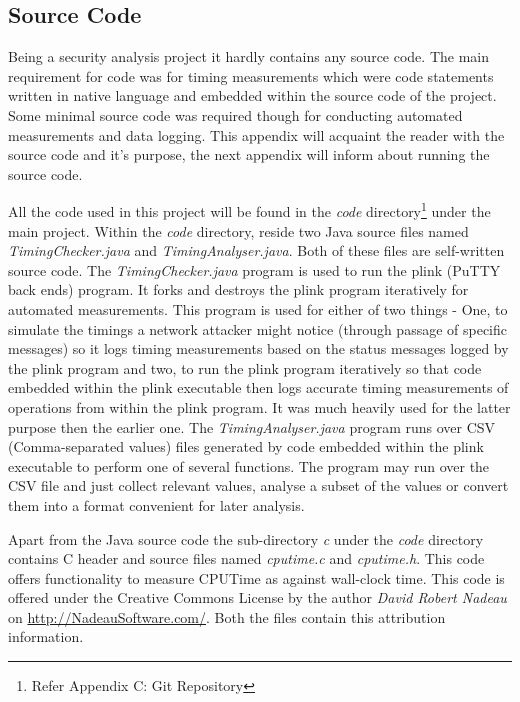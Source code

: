 \documentclass{bhamthesis}
\begin{document}
\begin{appendices}
\chapter{Source Code}
Being a security analysis project it hardly contains any source code. The main requirement for code was for timing measurements which were code statements written in native language and embedded within the source code of the project. Some minimal source code was required though for conducting automated measurements and data logging. This appendix will acquaint the reader with the source code and it's purpose, the next appendix will inform about running the source code.\par
All the code used in this project will be found in the \textit{code} directory\footnote{Refer Appendix C: Git Repository} under the main project. Within the \textit{code} directory, reside two Java source files named \textit{TimingChecker.java} and \textit{TimingAnalyser.java}. Both of these files are self-written source code. The \textit{TimingChecker.java} program is used to run the plink (PuTTY back ends) program. It forks and destroys the plink program iteratively for automated measurements. This program is used for either of two things - One, to simulate the timings a network attacker might notice (through passage of specific messages) so it logs timing measurements based on the status messages logged by the plink program and two, to run the plink program iteratively so that code embedded within the plink executable then logs accurate timing measurements of operations from within the plink program. It was much heavily used for the latter purpose then the earlier one. The \textit{TimingAnalyser.java} program runs over CSV (Comma-separated values) files generated by code embedded within the plink executable to perform one of several functions. The program may run over the CSV file and just collect relevant values, analyse a subset of the values or convert them into a format convenient for later analysis.\par
Apart from the Java source code the sub-directory \textit{c} under the \textit{code} directory contains C header and source files named \textit{cputime.c} and \textit{cputime.h}. This code offers functionality to measure CPUTime as against wall-clock time. This code is offered under the Creative Commons License by the author \textit{David Robert Nadeau} on \url{http://NadeauSoftware.com/}. Both the files contain this attribution information.

\end{appendices}
\end{document}
